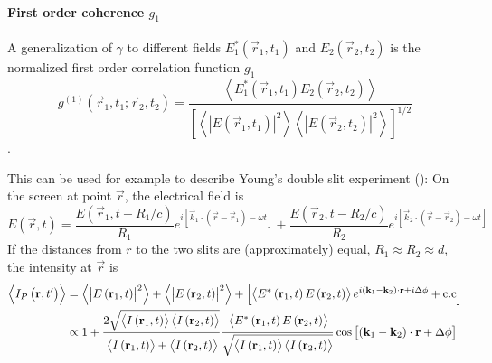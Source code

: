 \paragraph{First order coherence $g_1$}
A generalization of $\gamma$  to different fields  $E_1^*(\vec{r}_1,t_1)$ and $E_2(\vec{r}_2,t_2)$ is the normalized first order correlation function $g_1$ \cite{agarwal2013}
\begin{equation}
	g^{(1)}(\vec{r}_1,t_1;\vec{r}_2,t_2)= \frac
	{\left< E_1^*(\vec{r}_1,t_1)E_2(\vec{r}_2,t_2) \right>}
	{\left[ \left<\left | E(\vec{r}_1,t_1)\right |^2 \right> \left< \left |E(\vec{r}_2,t_2)\right |^2 \right>\right]^{1/2}}	
\end{equation}.



This can be used for example to describe Young's double slit experiment (): On the screen at point $\vec{r}$, the electrical field is 
\begin{equation}
	E(\vec{r}, t)=\frac{E\left(\vec{r}_{1}, t-R_{1} / c\right)}{R_{1}} e^{i\left[\vec{k}_{1} \cdot\left(\vec{r}-\vec{r}_{1}\right)-\omega t\right]}+\frac{E\left(\vec{r}_{2}, t-R_{2} / c\right)}{R_{2}} e^{i\left[\vec{k}_{2} \cdot\left(\vec{r}-\vec{r}_{2}\right)-\omega t\right]} 
\end{equation}
If the distances from $r$ to the two slits are (approximately) equal, $R_{1}\approx R_{2} \approx d$, the intensity at $\vec{r}$ is
\begin{align*}
	\left\langle I_{P}\left(\vec{r}, t^{\prime}\right)\right\rangle&=\left\langle\left|E\left(\vec{r}_{1}, t\right)\right|^{2}\right\rangle+\left\langle\left|E\left(\vec{r}_{2}, t\right)\right|^{2}\right\rangle 
	+\left[\left\langle E^{*}\left(\vec{r}_{1}, t\right) E\left(\vec{r}_{2}, t\right)\right\rangle e^{i\left(\vec{k}_{1}-\vec{k}_{2}\right) \cdot \vec{r}+i \Delta \phi}+\text{c.c}\right] \\
	& \propto 1+
	\frac{2 \sqrt{\left< I\left(\vec{r}_{1}, t\right)\right>\left< I\left(\vec{r}_{2}, t\right)\right>}}
	{\vphantom{2\sqrt{\left<I\left(\vec{r}_{1}\right)\right>}}\left< I\left(\vec{r}_{1}, t\right)\right>+\left< I\left(\vec{r}_{2}, t\right)\right>}	
	\frac{\vphantom{2\sqrt{\left<I\left(\vec{r}_{1}\right)\right>}}\left< E^{*}\left(\vec{r}_{1}, t\right) E\left(\vec{r}_{2}, t\right)\right>}
	{\vphantom{2\sqrt{\left<I\left(\vec{r}_{1}\right)\right>}}\sqrt{\left\langle I\left(\vec{r}_{1}, t\right)\right>\left\langle I\left(\vec{r}_{2}, t\right)\right>}}
	\cos \left[\left(\vec{k}_{1}-\vec{k}_{2}\right) \cdot \vec{r}+\Delta \phi\right]
\end{align*}


